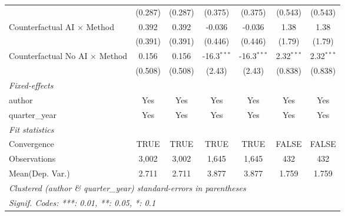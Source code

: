 \begin{tabular}{lcccccc}
                                         & (0.287)       & (0.287)       & (0.375)       & (0.375)       & (0.543)      & (0.543)\\   
   Counterfactual AI $\times$ Method     & 0.392         & 0.392         & -0.036        & -0.036        & 1.38         & 1.38\\   
                                         & (0.391)       & (0.391)       & (0.446)       & (0.446)       & (1.79)       & (1.79)\\   
   Counterfactual No AI $\times$ Method  & 0.156         & 0.156         & -16.3$^{***}$ & -16.3$^{***}$ & 2.32$^{***}$ & 2.32$^{***}$\\   
                                         & (0.508)       & (0.508)       & (2.43)        & (2.43)        & (0.838)      & (0.838)\\   
   \midrule
   \emph{Fixed-effects}\\
   author                                & Yes           & Yes           & Yes           & Yes           & Yes          & Yes\\  
   quarter\_year                         & Yes           & Yes           & Yes           & Yes           & Yes          & Yes\\  
   \midrule
   \emph{Fit statistics}\\
   Convergence                           &TRUE           & TRUE          & TRUE          & TRUE          & FALSE        & FALSE\\  
   Observations                          & 3,002         & 3,002         & 1,645         & 1,645         & 432          & 432\\  
Mean(Dep. Var.) & 2.711 & 2.711 & 3.877 & 3.877 & 1.759 & 1.759 \\
   \midrule \midrule
   \multicolumn{7}{l}{\emph{Clustered (author \& quarter\_year) standard-errors in parentheses}}\\
   \multicolumn{7}{l}{\emph{Signif. Codes: ***: 0.01, **: 0.05, *: 0.1}}\\
\end{tabular}
\par\endgroup
